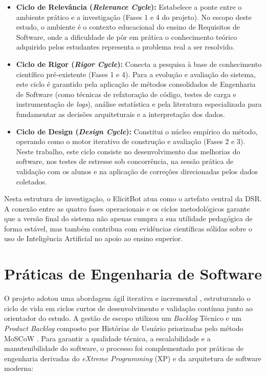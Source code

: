 \begin{itemize}
    \item \textbf{Ciclo de Relevância (\textit{Relevance Cycle}):} Estabelece a ponte entre o ambiente prático e a investigação (Fases 1 e 4 do projeto). No escopo deste estudo, o ambiente é o contexto educacional do ensino de Requisitos de Software, onde a dificuldade de pôr em prática o conhecimento teórico adquirido pelos estudantes representa o problema real a ser resolvido.
    \item \textbf{Ciclo de Rigor (\textit{Rigor Cycle}):} Conecta a pesquisa à base de conhecimento científico pré-existente (Fases 1 e 4). Para a evolução e avaliação do sistema, este ciclo é garantido pela aplicação de métodos consolidados de Engenharia de Software (como técnicas de refatoração de código, testes de carga e instrumentação de \textit{logs}), análise estatística e pela literatura especializada para fundamentar as decisões arquiteturais e a interpretação dos dados.
    \item \textbf{Ciclo de Design (\textit{Design Cycle}):} Constitui o núcleo empírico do método, operando como o motor iterativo de construção e avaliação (Fases 2 e 3). Neste trabalho, este ciclo consiste no desenvolvimento das melhorias do software, nos testes de estresse sob concorrência, na sessão prática de validação com os alunos e na aplicação de correções direcionadas pelos dados coletados.
\end{itemize}

Nesta estrutura de investigação, o ElicitBot atua como o artefato central da DSR. A conexão entre as quatro fases operacionais e os ciclos metodológicos garante que a versão final do sistema não apenas cumpra a sua utilidade pedagógica de forma estável, mas também contribua com evidências científicas sólidas sobre o uso de Inteligência Artificial no apoio ao ensino superior.

\section{Práticas de Engenharia de Software}
\label{sec:pra_eng_soft}

O projeto adotou uma abordagem ágil iterativa e incremental \cite{scrumstudy2024}, estruturando o ciclo de vida em ciclos curtos de desenvolvimento e validação contínua junto ao orientador do estudo. A gestão de escopo utilizou um \textit{Backlog} Técnico e um \textit{Product Backlog} composto por Histórias de Usuário priorizadas pelo método MoSCoW \cite{agilebusiness2014}. Para garantir a qualidade técnica, a escalabilidade e a manutenibilidade do software, o processo foi complementado por práticas de engenharia derivadas do \textit{eXtreme Programming} (XP) e da arquitetura de software moderna:

